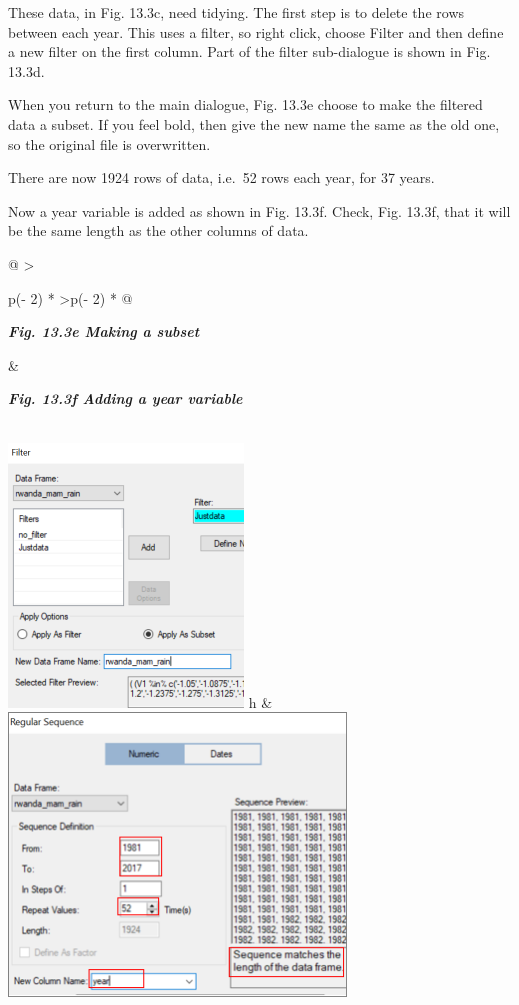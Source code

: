 \documentclass[
  letterpaper,
  DIV=11,
  numbers=noendperiod]{scrreprt}
\begin{document}
These data, in Fig. 13.3c, need tidying. The first step is to delete the
rows between each year. This uses a filter, so right click, choose
Filter and then define a new filter on the first column. Part of the
filter sub-dialogue is shown in Fig. 13.3d.

When you return to the main dialogue, Fig. 13.3e choose to make the
filtered data a subset. If you feel bold, then give the new name the
same as the old one, so the original file is overwritten.

There are now 1924 rows of data, i.e.~52 rows each year, for 37 years.

Now a year variable is added as shown in Fig. 13.3f. Check, Fig. 13.3f,
that it will be the same length as the other columns of data.

\begin{longtable}[]{@{}
  >{\raggedright\arraybackslash}p{(\columnwidth - 2\tabcolsep) * }
  >{\raggedleft\arraybackslash}p{(\columnwidth - 2\tabcolsep) * }@{}}
\toprule\noalign{}
\begin{minipage}[b]{\linewidth}\raggedright
\textbf{\emph{Fig. 13.3e Making a subset}}
\end{minipage} & \begin{minipage}[b]{\linewidth}\raggedleft
\textbf{\emph{Fig. 13.3f Adding a year variable}}
\end{minipage} \\
\midrule\noalign{}
\endhead
\bottomrule\noalign{}
\endlastfoot
\includegraphics[width=2.45924in,height=2.76143in]{figures/Fig13.3e.png}
h &
\includegraphics[width=3.5354in,height=\textheight]{figures/Fig13.3f.png} \\
\end{longtable}
\end{document}
